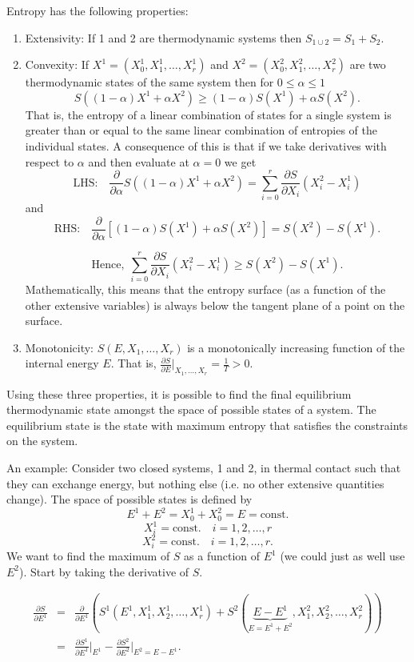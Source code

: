 Entropy has the following properties:
\begin{enumerate}
\item Extensivity: If 1 and 2 are thermodynamic systems then $S_{1\cup2}=S_1+S_2$.

\item Convexity: If $X^1=(X_0^1,X_1^1,\ldots,X_r^1)$ and  $X^2=(X_0^2,X_1^2,\ldots,X_r^2)$ are two thermodynamic states of the same system then for $0\leq\alpha\leq1$
$$
	S((1-\alpha)X^1+\alpha X^2)\geq (1-\alpha)S(X^1)+\alpha S(X^2). 
$$
That is, the entropy of a linear combination of states for a single system is greater than or equal to the same linear combination of entropies of the individual states.
A consequence of this is that if we take derivatives with respect to $\alpha$  and then evaluate at $\alpha=0$ we get
$$
	\mbox{LHS:} \quad\frac{\partial}{\partial \alpha} S((1-\alpha)X^1+\alpha X^2) = \sum_{i=0}^r\frac{\partial S}{\partial X_i}(X_i^2-X_i^1)
$$
and
$$
	\mbox{RHS:} \quad\frac{\partial}{\partial \alpha} \left[ (1-\alpha)S(X^1)+\alpha S(X^2) \right] = S(X^2)-S(X^1).
$$

$$ \mbox{Hence,}~~ \sum_{i=0}^r\frac{\partial S}{\partial X_i}(X_i^2-X_i^1)\geq  S(X^2)-S(X^1).$$
Mathematically, this means that the entropy surface (as a function of the other extensive variables) is always below the tangent plane of a point on the surface.

\item Monotonicity: $S(E,X_1,\ldots,X_r)$ is a monotonically increasing function of the internal energy $E$. That is, $\frac{\partial S}{\partial E}\vert_{X_1,\ldots,X_r} = \frac{1}{T}>0$.
\end{enumerate}

Using these three properties, it is possible to find the final equilibrium thermodynamic state amongst the space of possible states of a system. The equilibrium state is the state with maximum entropy that satisfies the constraints on the system.

An example: Consider two closed systems, 1 and 2, in thermal contact such that they can exchange energy, but nothing else (i.e. no other extensive quantities change). The space of possible states is defined by 
$$E^1+E^2 = X_0^1+X_0^2 = E = \text{const.}$$
$$X_i^1 = \text{const.}\quad i=1,2,\ldots,r$$
$$X_i^2 = \text{const.}\quad i=1,2,\ldots,r.$$
We want to find the maximum of $S$ as a function of $E^1$ (we could just as well use $E^2$). Start by taking the derivative of $S$.

\begin{eqnarray*}
	\frac{\partial S}{\partial E^1} &=& \frac{\partial}{\partial E^1}\left(S^1(E^1,X_1^1,X_2^1,\ldots,X_r^1) + S^2(\underbrace{E-E^1}_{E=E^1+E^2},X_1^2,X_2^2,\ldots,X_r^2) \right)\\
	 &=& \frac{\partial S^1}{\partial E^1}\bigg\vert_{E^1} -  \frac{\partial S^2}{\partial E^2}\bigg\vert_{E^2=E-E^1}.
\end{eqnarray*}

